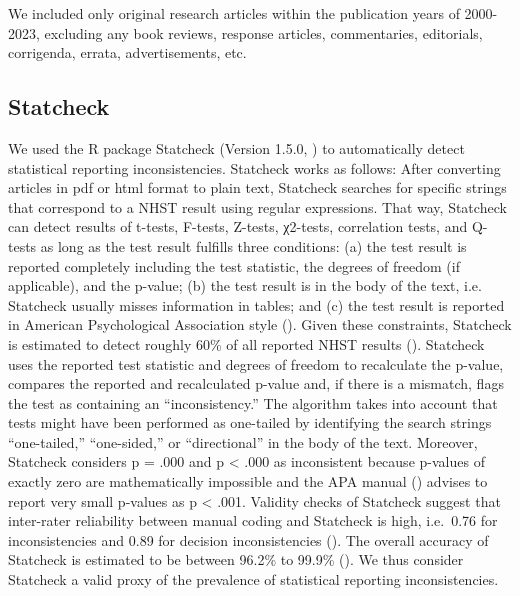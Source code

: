 \documentclass[
  doc,
  longtable,
  nolmodern,
  notxfonts,
  notimes,
  colorlinks=true,linkcolor=blue,citecolor=blue,urlcolor=blue]{apa7}
\begin{document}
We included only original research articles within the publication years
of 2000-2023, excluding any book reviews, response articles,
commentaries, editorials, corrigenda, errata, advertisements, etc.

\subsection{Statcheck}\label{statcheck}

We used the R package Statcheck (Version 1.5.0,
) to
automatically detect statistical reporting inconsistencies. Statcheck
works as follows: After converting articles in pdf or html format to
plain text, Statcheck searches for specific strings that correspond to a
NHST result using regular expressions. That way, Statcheck can detect
results of t-tests, F-tests, Z-tests, χ2-tests, correlation tests, and
Q-tests as long as the test result fulfills three conditions: (a) the
test result is reported completely including the test statistic, the
degrees of freedom (if applicable), and the p-value; (b) the test result
is in the body of the text, i.e. Statcheck usually misses information in
tables; and (c) the test result is reported in American Psychological
Association style (). Given these constraints, Statcheck is estimated to
detect roughly 60\% of all reported NHST results
(). Statcheck
uses the reported test statistic and degrees of freedom to recalculate
the p-value, compares the reported and recalculated p-value and, if
there is a mismatch, flags the test as containing an ``inconsistency.''
The algorithm takes into account that tests might have been performed as
one-tailed by identifying the search strings ``one-tailed,''
``one-sided,'' or ``directional'' in the body of the text. Moreover,
Statcheck considers p = .000 and p \textless{} .000 as inconsistent
because p-values of exactly zero are mathematically impossible and the
APA manual () advises to report very small p-values as p \textless{} .001.
Validity checks of Statcheck suggest that inter-rater reliability
between manual coding and Statcheck is high, i.e.~0.76 for
inconsistencies and 0.89 for decision inconsistencies
(). The
overall accuracy of Statcheck is estimated to be between 96.2\% to
99.9\% (). We
thus consider Statcheck a valid proxy of the prevalence of statistical
reporting inconsistencies.
\end{document}
